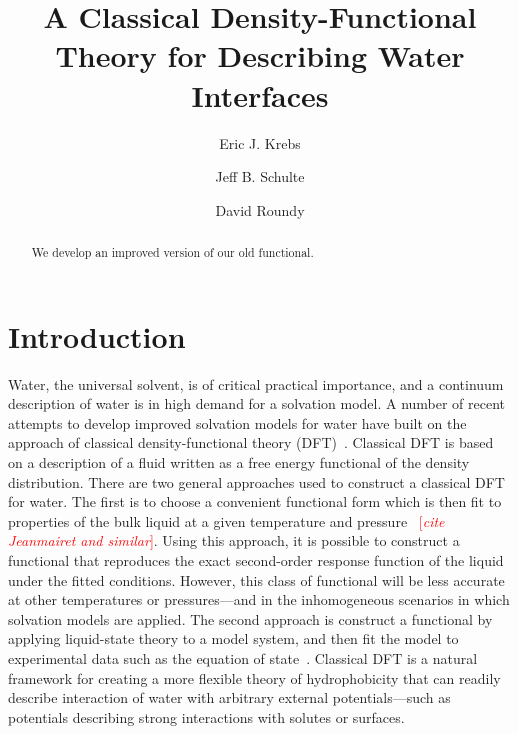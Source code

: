 \documentclass[twocolumn,amsmath,amssymb,prl]{revtex4-1}
\newcommand{\fixme}[1]{\textcolor{red}{[\emph{#1}]}}
\begin{document}
\title{A Classical Density-Functional Theory for Describing Water Interfaces}

\author{Eric J. Krebs}
\author{Jeff B. Schulte}
\author{David Roundy}

\begin{abstract}
We develop an improved version of our old functional.
\end{abstract}
\maketitle

\section{Introduction}

Water, the universal solvent, is of critical practical importance, and
a continuum description of water is in high demand for a solvation
model.  A number of recent attempts to develop improved solvation
models for water have built on the approach of classical
density-functional theory (DFT)~\cite{jeanmairet2013molecular,
  zhao2011molecular, zhao2011new, ramirez2005direct,
  ramirez2005density, levesque2012solvation, levesque2012scalar}.
Classical DFT is based on a description of a fluid written as a free
energy functional of the density distribution.  There are two general
approaches used to construct a classical DFT for water.  The first is
to choose a convenient functional form which is then fit to properties
of the bulk liquid at a given temperature and pressure
\cite{jeanmairet2013molecular, lischner2010classical} ~\fixme{cite
  Jeanmairet and similar}.  Using this approach, it is possible to
construct a functional that reproduces the exact second-order response
function of the liquid under the fitted conditions.  However, this
class of functional will be less accurate at other temperatures or
pressures---and in the inhomogeneous scenarios in which solvation
models are applied.  The second approach is construct a functional by
applying liquid-state theory to a model system, and then fit the model
to experimental data such as the equation of
state~\cite{hughes2013classical, clark2006developing, gloor2002saft,
  gloor2004accurate, gloor2007prediction, Jaqaman2004, chuev2006,
  fu2005vapor-liquid-dft,kiselev2006new, blas2001examination,
  sundararaman2012computationally}.  Classical DFT is a natural
framework for creating a more flexible theory of hydrophobicity that
can readily describe interaction of water with arbitrary external
potentials---such as potentials describing strong interactions with
solutes or surfaces.
\end{document}
